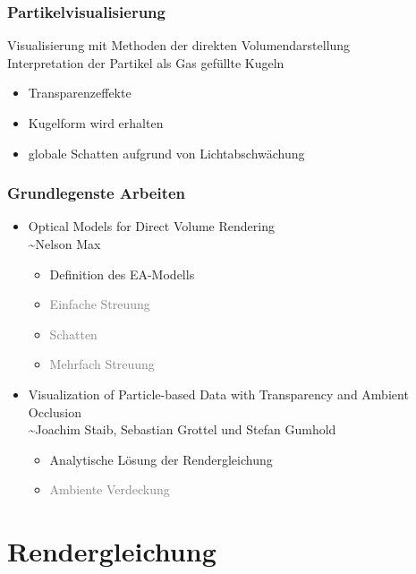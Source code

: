 \documentclass[xcolor=dvipsnames]{beamer}
\begin{document}
\begin{frame}
	\frametitle{Partikelvisualisierung}
	
	Visualisierung mit Methoden der direkten Volumendarstellung \\
	\vspace{0.5cm}
	Interpretation der Partikel als Gas gefüllte Kugeln
	\vspace{0.5cm}
	\begin{itemize}
		\setlength{\itemsep}{8pt}
		\item Transparenzeffekte
		\item Kugelform wird erhalten
		\item globale Schatten aufgrund von Lichtabschwächung
	\end{itemize}
\end{frame}

\begin{frame}
	\frametitle{Grundlegenste Arbeiten}
	
	\begin{itemize}
		\setlength{\itemsep}{20pt}
		\item{Optical Models for Direct Volume Rendering} \\ 
		\textasciitilde Nelson Max 
		\cite{Max:1995:OMD:614258.614298}
		\begin{itemize}
			\item Definition des EA-Modells
			\item \textcolor{Gray}{Einfache Streuung}
			\item \textcolor{Gray}{Schatten}
			\item \textcolor{Gray}{Mehrfach Streuung}
		\end{itemize}
		
		\item{Visualization of Particle-based Data with Transparency and Ambient Occlusion} \\
		\textasciitilde Joachim Staib, Sebastian Grottel und Stefan Gumhold
		\cite{CGF34-3:151-160:2015}
		\begin{itemize}
			\item Analytische Lösung der Rendergleichung
			\item \textcolor{Gray}{Ambiente Verdeckung}
		\end{itemize}
	\end{itemize}
\end{frame}

\section{\textbullet \hspace{0.2cm} Rendergleichung}
\end{document}
